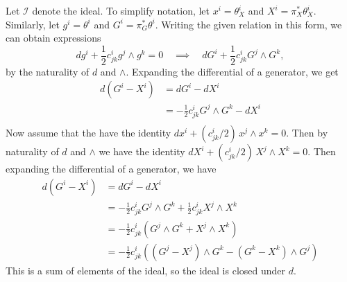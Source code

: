 \documentclass{../../templates/lkx_pset}
\begin{document}
\begin{parts}
	Let $\mathcal{I}$ denote the ideal. To simplify notation, let $x^i = \theta^i_X$ and $X^i=\pi_X^* \theta^i_X$. Similarly, let $g^i = \theta^i$ and $G^i = \pi_G^*\theta^i$.
	Writing the given relation in this form, we can obtain expressions
	\[
		dg^i + \frac{1}{2}c^i_{j k} g^j\wedge g^k = 0\quad\implies\quad dG^i + \frac{1}{2}c^i_{j k} G^j\wedge G^k,
	\]
	by the naturality of $d$ and $\wedge$.
	Expanding the differential of a generator, we get
	\[
		\begin{aligned}
			d(G^i - X^i)
			 & = dG^i - dX^i                                 \\
			 & = -\frac{1}{2}c^i_{j k} G^j \wedge G^k - dX^i \\
		\end{aligned}
	\]
	Now assume that the have the identity $dx^i + (c^i_{j k} /2)\,x^j \wedge x^k = 0$. Then by naturality of $d$ and $\wedge$ we have the identity $dX^i + (c^i_{j k} / 2)\,X^j \wedge X^k=0$. Then expanding the differential of a generator, we have
	\[
		\begin{aligned}
			d(G^i - X^i)
			 & = dG^i - dX^i                                                                  \\
			 & = -\frac{1}{2}c^i_{j k}G^j \wedge G^k + \frac{1}{2}c^i_{j k} X^j \wedge X^k    \\
			 & = -\frac{1}{2}c^i_{j k}\left( G^j\wedge G^k + X^j \wedge X^k\right)            \\
			 & = -\frac{1}{2}c^i_{j k}\left( (G^j-X^j)\wedge G^k - (G^k-X^k)\wedge G^j\right)
		\end{aligned}
	\]
	This is a sum of elements of the ideal, so the ideal is closed under $d$.


\end{parts}
\end{document}
